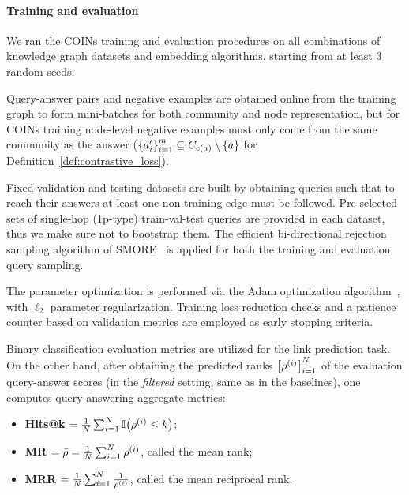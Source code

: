 \paragraph{Training and evaluation}
We ran the COINs training and evaluation procedures on all combinations of knowledge graph datasets and embedding algorithms, starting from at least 3 random seeds. 

Query-answer pairs and negative examples are obtained online from the training graph to form mini-batches for both community and node representation, but for COINs training node-level negative examples must only come from the same community as the answer ($\mathopen{}\left\{a'_i\right\}_{i=1}^m \subseteq C_{c\mathopen{}\left(a\right)}\setminus\mathopen{}\left\{a\right\}$ for Definition~\ref{def:contrastive_loss}). 

Fixed validation and testing datasets are built by obtaining queries such that to reach their answers at least one non-training edge must be followed. Pre-selected sets of single-hop (1p-type) train-val-test queries are provided in each dataset, thus we make sure not to bootstrap them. The efficient bi-directional rejection sampling algorithm of SMORE~\cite{ren_smore_2021} is applied for both the training and evaluation query sampling. 

The parameter optimization is performed via the Adam optimization algorithm~\cite{kingma_adam_2015}, with $\ell_2$ parameter regularization. Training loss reduction checks and a patience counter based on validation metrics are employed as early stopping criteria.

Binary classification evaluation metrics are utilized for the link prediction task. On the other hand, after obtaining the predicted ranks $\mathopen{}\left[\rho^{\mathopen{}\left(i\right)}\right]_{i=1}^{N}$ of the evaluation query-answer scores (in the \emph{filtered} setting, same as in the baselines), one computes query answering aggregate metrics:
\begin{itemize}
    \item \textbf{Hits@k} $= \frac{1}{N}\sum_{i=1}^{N}{\mathbb{I}\mathopen{}\left(\rho^{\mathopen{}\left(i\right)} \leq k\right)}$;
    \item \textbf{MR} $= \bar{\rho} = \frac{1}{N}\sum_{i=1}^{N}{\rho^{\mathopen{}\left(i\right)}}$, called the mean rank;
    \item \textbf{MRR} $= \frac{1}{N}\sum_{i=1}^{N}{\frac{1}{\rho^{\mathopen{}\left(i\right)}}}$, called the mean reciprocal rank.
\end{itemize}

%

